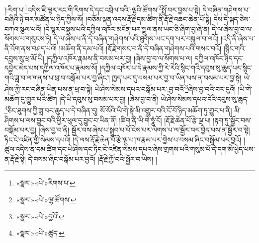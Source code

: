 །:རིག་པ་\footnote{«སྣར་»«པེ་»རིགས་པ་}འདིས་ཇི་ལྟར་རང་གི་རིགས་དེ་དང་འབྲེལ་བའི་:ལྷའི་ཚོགས་\footnote{«སྣར་»«པེ་»ལྷ་ཚོགས་}སྤྲོ་བར་བྱས་པ་སྟེ། དེ་བཞིན་གཤེགས་པ་བཞིའི་ཉེ་བར་མཚོན་པ་ཉིད་ཀྱིས་སོ། །བཅོམ་ལྡན་འདས་རྡོ་རྗེ་དམ་ཚིག་ནི་རྡོ་རྗེ་འཆང་ཆེན་པོ་སྟེ། དེས་དེ་སྐད་ཅེས་བཀའ་སྩལ་པའོ། །དེ་ལྟར་བསྡུས་པའི་དཀྱིལ་འཁོར་མངོན་པར་སྤྲུལ་ནས་ཡང་ཅི་ཞིག་བྱ་ཞེ་ན། དེ་ལ་ཞེས་བྱ་བ་ལ་སོགས་པ་གསུངས་ཏེ། དེ་ལ་ཞེས་པ་ནི་དེ་བཞིན་གཤེགས་པའི་ཐུགས་ཡང་དག་པར་བསྐུལ་བ་ལའོ། །འདི་ནི་ཞེས་པ་ནི་འོག་ནས་བཤད་པའོ། །མཆོག་ནི་དམ་པའོ། །རྡོ་རྗེ་གསང་བ་ནི་དེ་བཞིན་གཤེགས་པའི་གསང་བའོ། །སྙིང་གའི་དབུས་སུ་ཕྲ་མོ་ཡི། །དཀྱིལ་འཁོར་རྣམས་ནི་བསམ་པར་བྱ། །ཞེས་བྱ་བ་ལ་སོགས་པ་ལ། དཀྱིལ་འཁོར་ཉིད་དང་དབྱེར་མེད་པས་དཀྱིལ་འཁོར་པ་རྣམས་སོ། །དཀྱིལ་འཁོར་པ་དེ་རྣམས་ཀྱི་རེ་རེའི་སྙིང་གའི་དབུས་སུ་ཆུད་པར་སྙིང་གའི་ཟླ་བ་ལ་གནས་པ་ཕྲ་བ་བསྒོམ་པར་བྱ་ཞིང་། ཁྱད་པར་དུ་བསམ་པར་བྱ་བ་ཡིན་པས་ན་བསམ་པར་བྱ་སྟེ། ཡེ་ཤེས་ཀྱི་རང་བཞིན་ཡིན་པས་ན་ཕྲ་བ་སྟེ། ཡེ་ཤེས་སེམས་དཔའ་བསྒོམ་པར་:བྱ་བའོ་\footnote{«སྣར་»«པེ་»བྱའོ་}ཞེས་བྱ་བའི་བར་དུའོ། །ཡི་གེ་མཆོག་དུ་གྱུར་པའི་ཚིག །དེ་ཡི་དབུས་སུ་བསམ་པར་བྱ། །ཞེས་བྱ་བ་ནི། ཡེ་ཤེས་སེམས་དཔའ་དེའི་དབུས་སུ་ཆུད་\footnote{«སྣར་»«པེ་»ཚུད་}ཅིང་ཐུགས་ཀྱི་ཟླ་བར་ཆུད་པ་དེ་བཞིན་དུ། སོ་སོའི་ཡི་གེ་སྟེ་མི་འགྱུར་བའི་ངོ་བོ་ཉིད་མཆོག་ཏུ་གྱུར་པ་ནི། མི་ཤིགས་པ་ལས་བྱུང་བའི་ཕྱིར་ཕུལ་དུ་བྱུང་བ་ཡིན་ནོ། །ཚིག་ནི་ཡི་གེ་ཧཱུཾ་ངོ། །རྡོ་རྗེ་ཆེན་པོ་རྩེ་ལྔ་པ། །རྟག་ཏུ་སྦྱོར་བས་བསྒོམ་པར་བྱ། །ཞེས་བྱ་བ་ནི། སྦྱོར་བས་ཞེས་པ་སྒྲུབ་པ་པོ་ངེས་པར་ལེགས་པ་ལ་སྦྱོར་བར་བྱེད་པས་ན་སྦྱོར་བ་སྟེ། ཏིང་ངེ་འཛིན་གྱི་སེམས་དཔའོ། །དེ་ལས་རྡོ་རྗེ་ཆེན་པོ་རྩེ་ལྔ་པ་ཁ་རྣམ་པར་གྱེས་པ་བསམ་ཞིང་བསྒོམ་པར་བྱའོ། །ཚུལ་འདིས་ན་དམ་ཚིག་དང་ཡེ་ཤེས་དང་ཏིང་ངེ་འཛིན་སེམས་དཔའ་ཞེས་གྲགས་པའི་གསུམ་པོ་དེ་དག་མི་ཕྱེད་པས་ན་རྡོ་རྗེ་སྟེ། དེ་བསམ་ཞིང་བསྒོམ་པར་བྱའོ། །རྡོ་རྗེ་ཀྱོ་བའི་སྦྱོར་བ་ཡིས། །
